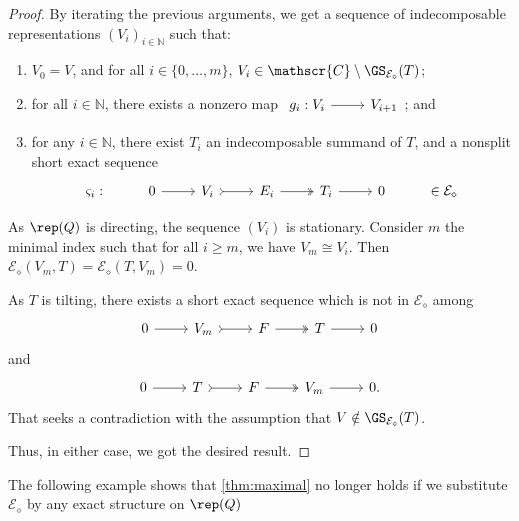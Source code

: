 \begin{proof}
By iterating the previous arguments, we get a sequence of indecomposable representations $(V_i)_{i \in \mathbb{N}}$ such that:
\begin{enumerate}[label=$\bullet$, itemsep=1mm]
    \item $V_0 = V$, and for all $i \in \{0,\ldots,m\}$,  $V_i \in \mathscr{C} \setminus \GS_{\mathcal{E}_\diamond}(T)$;
    \item for all $i \in \mathbb{N}$, there exists a nonzero map $\begin{tikzcd}
        g_i : V_i & V_{i+1} 
	\arrow[from=1-1, to=1-2]
\end{tikzcd}$; and
    \item  for any $i \in \mathbb{N}$, there exist $T_i$ an indecomposable summand of $T$, and a nonsplit short exact sequence \[\begin{tikzcd}
	 \varsigma_i : & 0 & V_i & E_i & T_i &  0 & \in \mathcal{E}_\diamond
	\arrow[from=1-2, to=1-3]
	\arrow[tail, from=1-3, to=1-4]
	\arrow[two heads,from=1-4, to=1-5]
	\arrow[from=1-5, to=1-6]
\end{tikzcd}\]
\end{enumerate}

As $\rep(Q)$ is directing, the sequence $(V_i)$ is stationary. Consider $m$ the minimal index such that for all $i \geqslant m$, we have $V_m \cong V_i$. Then $\mathcal{E}_\diamond(V_m,T) = \mathcal{E}_\diamond(T,V_m) = 0$.

As $T$ is tilting, there exists a short exact sequence which is not in $\mathcal{E}_\diamond$ among 
\[\begin{tikzcd}
	 0 & V_m & F & T &  0 
	\arrow[from=1-1, to=1-2]
	\arrow[tail, from=1-2, to=1-3]
	\arrow[two heads,from=1-3, to=1-4]
	\arrow[from=1-4, to=1-5]
\end{tikzcd}\] and \[\begin{tikzcd}
	 0 & T & F & V_m &  0 .
	\arrow[from=1-1, to=1-2]
	\arrow[tail, from=1-2, to=1-3]
	\arrow[two heads,from=1-3, to=1-4]
	\arrow[from=1-4, to=1-5]
\end{tikzcd}\] That seeks a contradiction with the assumption that $V \notin \GS_{\mathcal{E}_\diamond}(T)$.

Thus, in either case, we got the desired result.
\end{proof}

The following example shows that \cref{thm:maximal} no longer holds if we substitute $\mathcal{E}_\diamond$ by any exact structure on $\rep(Q)$

\begin{ex} \label{ex:dontworkforanyE}
\end{ex}

